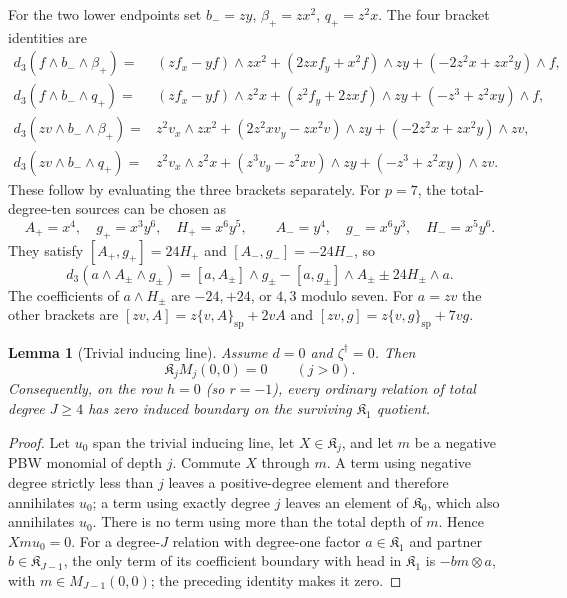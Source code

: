 \documentclass[11pt]{article}
\theoremstyle{plain}
\newtheorem{lemma}[lemma]{Lemma}
\theoremstyle{definition}
\theoremstyle{remark}
\numberwithin{equation}{section}
\newcommand{\Kalg}{\mathfrak K}
\newcommand{\spb}{\mathrm{sp}}
\begin{document}
For the two lower endpoints set
$b_-=zy$, $\beta_+=zx^2$, $q_+=z^2x$.
The four bracket identities are
\begin{align*}
 d_3(f\wedge b_-\wedge\beta_+)
 ={}&(zf_x-yf)\wedge zx^2
 +(2zxf_y+x^2f)\wedge zy
 +(-2z^2x+zx^2y)\wedge f,\\
 d_3(f\wedge b_-\wedge q_+)
 ={}&(zf_x-yf)\wedge z^2x
 +(z^2f_y+2zxf)\wedge zy
 +(-z^3+z^2xy)\wedge f,\\
 d_3(zv\wedge b_-\wedge\beta_+)
 ={}&z^2v_x\wedge zx^2+(2z^2xv_y-zx^2v)\wedge zy
 +(-2z^2x+zx^2y)\wedge zv,\\
 d_3(zv\wedge b_-\wedge q_+)
 ={}&z^2v_x\wedge z^2x+(z^3v_y-z^2xv)\wedge zy
 +(-z^3+z^2xy)\wedge zv.
\end{align*}
These follow by evaluating the three brackets separately.
For $p=7$, the total-degree-ten sources can be chosen as
\[
 A_+=x^4,\quad g_+=x^3y^6,\quad H_+=x^6y^5,
 \qquad A_-=y^4,\quad g_-=x^6y^3,\quad H_-=x^5y^6.
\]
They satisfy $[A_+,g_+]=24H_+$ and $[A_-,g_-]=-24H_-$, so
\[
 d_3(a\wedge A_\pm\wedge g_\pm)
 =[a,A_\pm]\wedge g_\pm-[a,g_\pm]\wedge A_\pm
       \pm24H_\pm\wedge a.
\]
The coefficients of $a\wedge H_\pm$ are $-24,+24$, or $4,3$ modulo seven.
For $a=zv$ the other brackets are
$[zv,A]=z\{v,A\}_{\spb}+2vA$ and
$[zv,g]=z\{v,g\}_{\spb}+7vg$.

\begin{lemma}[Trivial inducing line]\label{lem:trivial-inducing}
Assume $d=0$ and $\zeta^\dagger=0$.  Then
\[
 \Kalg_jM_j(0,0)=0
 \qquad(j>0).
\]
Consequently, on the row $h=0$ (so $r=-1$), every ordinary relation of total degree
$J\ge4$ has zero induced boundary on the surviving $\Kalg_1$ quotient.
\end{lemma}

\begin{proof}
Let $u_0$ span the trivial inducing line, let $X\in\Kalg_j$, and let $m$ be a negative
PBW monomial of depth $j$.  Commute $X$ through $m$.  A term using negative degree
strictly less than $j$ leaves a positive-degree element and therefore annihilates $u_0$;
a term using exactly degree $j$ leaves an element of $\Kalg_0$, which also annihilates
$u_0$.  There is no term using more than the total depth of $m$.  Hence $Xm u_0=0$.
For a degree-$J$ relation with degree-one factor $a\in\Kalg_1$ and partner
$b\in\Kalg_{J-1}$, the only term of its coefficient boundary with head in $\Kalg_1$
is $-bm\otimes a$, with $m\in M_{J-1}(0,0)$; the preceding identity makes it zero.
\end{proof}
\end{document}
